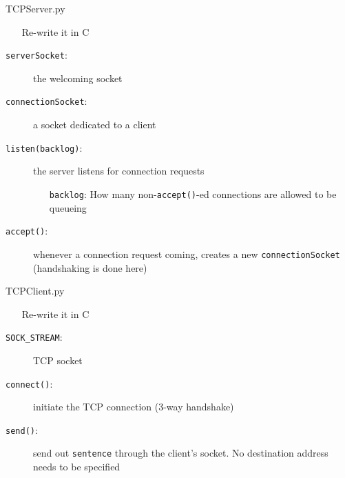 \begin{frame}{TCPServer.py}
  \begin{minipage}{.5\linewidth}
    \begin{itemize}
    \item[\hw] Re-write it in C
    \end{itemize}
  \end{minipage}\hfill
  \begin{minipage}{.47\linewidth}
    \footnotesize
    \begin{description}
    \item[\texttt{serverSocket}:] the welcoming socket
    \item[\texttt{connectionSocket}:] a socket dedicated to a client
    \item[\texttt{listen(backlog)}:] the server listens for connection requests
      \begin{itemize}
      \item[\texttt{backlog}:] {\scriptsize How many non-\texttt{accept()}-ed connections
          are allowed to be queueing}
      \end{itemize}
    \item[\texttt{accept()}:] whenever a connection request coming, creates a new
      \texttt{connectionSocket} (handshaking is done here)
    \end{description}
  \end{minipage}
\end{frame}

\begin{frame}{TCPClient.py}
  \begin{minipage}{.5\linewidth}
    \begin{itemize}
    \item[\hw] Re-write it in C
    \end{itemize}
  \end{minipage}\hfill
  \begin{minipage}{.47\linewidth}
    \begin{description}
    \item[\texttt{SOCK\_STREAM}:] TCP socket
    \item[\texttt{connect()}:] initiate the TCP connection (3-way handshake)
    \item[\texttt{send()}:] send out \texttt{sentence} through the client's socket. No
      destination address needs to be specified
    \end{description}
  \end{minipage}
\end{frame}

